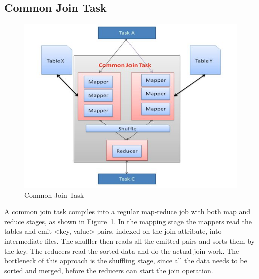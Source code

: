 \documentclass[11 pt ]{article}
\begin{document}
\subsection{Common Join Task}
\begin{figure}
	      \centering
                \includegraphics[scale=0.6]{common.jpg}
              \caption{Common Join Task \cite{facebook-join}}
              \label{fig:common-join}
\end{figure}

A common join task compiles into a regular map-reduce job with both map and reduce stages, as shown in Figure~\ref{fig:common-join}. In the mapping stage the mappers read the tables and emit <key, value> pairs, indexed on the join attribute, into intermediate files. The shuffler then reads all the emitted pairs and sorts them by the key. The reducers read the sorted data and do the actual join work. The bottleneck of this approach is the shuffling stage, since all the data needs to be sorted and merged, before the reducers can start the join operation.
\end{document}
